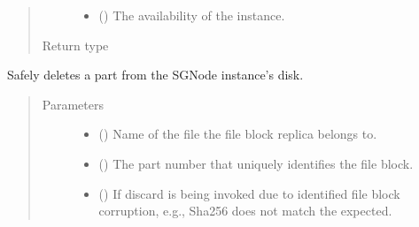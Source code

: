 \documentclass[letterpaper,10pt,english]{sphinxmanual}
\begin{document}
\begin{fulllineitems}
\begin{fulllineitems}
\begin{quote}
\begin{description}
\begin{itemize}
\item {} 
 () \textendash{} The availability of the  instance.

\end{itemize}

\item[{Return type}] \leavevmode
{}

\end{description}\end{quote}

\end{fulllineitems}


\begin{fulllineitems}
\label{\detokenize{app.domain:app.domain.network_nodes.Node.discard_part}}
Safely deletes a part from the SGNode instance’s disk.
\begin{quote}\begin{description}
\item[{Parameters}] \leavevmode\begin{itemize}
\item {} 
 () \textendash{} Name of the file the file block replica belongs to.

\item {} 
 () \textendash{} The part number that uniquely identifies the file block.

\item {} 
 () \textendash{} If discard is being invoked due to identified file
block corruption, e.g., Sha256 does not match the expected.


\end{itemize}
\end{description}
\end{quote}
\end{fulllineitems}
\end{fulllineitems}
\end{document}
